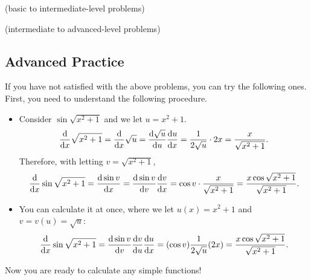 \documentclass[11pt,pdfa,lastpage]{MishoNote}
\begin{document}
\begin{enumerate}[resume]
  \itemA \textsf{(basic to intermediate-level problems)}
\begin{menumerate}{4}
\end{menumerate}
\itemB \textsf{(intermediate to advanced-level problems)}
\begin{menumerate}{3}


\end{menumerate}
\end{enumerate}

\newpage

\subsection{Advanced Practice}

If you have not satisfied with the above problems, you can try the following ones.
First, you need to understand the following procedure.
\begin{itemize}
  \item Consider $\sin\sqrt{x^2+1}$ and we let $u=x^2+1$.
  \[
    \diff{}{x}\sqrt{x^2+1}=\diff{}{x}\sqrt u=\diff{\sqrt u}{u}\diff ux=\frac{1}{2\sqrt u}\cdot2x=\frac{x}{\sqrt{x^2+1}}.
  \]
  Therefore, with letting $v=\sqrt{x^2+1}$,
  \[
  \diff{}{x}\sin\sqrt{x^2+1}=\diff{\sin v}{x}=\diff{\sin v}{v}\diff vx=\cos v\cdot\frac{x}{\sqrt{x^2+1}}=\frac{x\cos\sqrt{x^2+1}}{\sqrt{x^2+1}}.
  \]
  \item You can calculate it at once, where we let $u(x)=x^2+1$ and $v=v(u)=\sqrt{u}$:
  \[
   \diff{}{x}\sin\sqrt{x^2+1}=\diff{\sin v}{v}\diff{v}{u}\diff{u}{x}=(\cos v)\frac{1}{2\sqrt{u}}(2x)=\frac{x\cos\sqrt{x^2+1}}{\sqrt{x^2+1}}.
   \]
\end{itemize}
Now you are ready to calculate any simple functions!
\end{document}
